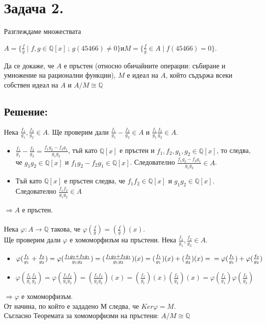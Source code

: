 \documentclass[10pt]{article}
\newcommand*{\Q}{\mathbb{Q}}
\begin{document}
\section*{Задача 2.}
Разглеждаме множествата
\begin{center}
	$A = \{\frac{f}{g} \mid f, g \in \Q[x] \,;\, g(45466) \neq 0\}$\quad и\quad$M = \{\frac{f}{g} \in A \mid f(45466) = 0\}$.
\end{center}
Да се докаже, че $A$ е пръстен (относно обичайните операции: събиране и умножение на рационални
функции), $M$ е идеал на $A$, който съдържа всеки собствен идеал на $A$ и $A/M \cong \Q$
\subsection*{Решение:}
Нека $\frac{f_1}{g_1}, \frac{f_2}{g_2} \in A$.
Ще проверим дали $\frac{f_1}{g_1} - \frac{f_2}{g_2} \in A$ и $\frac{f_1}{g_1}\frac{f_2}{g_2} \in A$.\\
\begin{itemize}
	\item $\frac{f_1}{g_1} - \frac{f_2}{g_2} = \frac{f_1g_2 - f_2g_1}{g_1g_2}$, тъй като $\Q[x]$ е пръстен и $f_1, f_2, g_1, g_2 \in \Q[x]$, то следва, че $g_1g_2 \in \Q[x]$ и $f_1g_2 - f_2g_1 \in \Q[x]$. Следователно $\frac{f_1g_2 - f_2g_1}{g_1g_2} \in A$.
	\item Тъй като $\Q[x]$ е пръстен следва, че $f_1f_2 \in \Q[x]$ и $g_1g_2 \in \Q[x]$. Следователно $\frac{f_1f_2}{g_1g_2} \in A$
\end{itemize}
$\Rightarrow A$ е пръстен.\\
\\
Нека $\varphi: A \to \Q$ такова, че $\varphi(\frac{f}{g}) = (\frac{f}{g})(x)$.\\
Ще проверим дали $\varphi$ е хомоморфизъм на пръстени. Нека $\frac{f_1}{g_1}, \frac{f_2}{g_2} \in A$.
\begin{itemize}
	\item $\varphi(\frac{f_1}{g_1} + \frac{f_2}{g_2}) = \varphi(\frac{f_1g_2 + f_2g_1}{g_1g_2}) = (\frac{f_1g_2 + f_2g_1}{g_1g_2})(x) = (\frac{f_1}{g_1})(x) + (\frac{f_2}{g_2})(x) = \\ = \varphi(\frac{f_1}{g_1}) + \varphi(\frac{f_2}{g_2})$
	\item $\varphi(\frac{f_1}{g_1}\frac{f_2}{g_2}) = \varphi(\frac{f_1f_2}{g_1g_2}) = (\frac{f_1f_2}{g_1g_2})(x) = (\frac{f_1}{g_1})(x)(\frac{f_2}{g_2})(x) = \varphi(\frac{f_1}{g_1})\varphi(\frac{f_2}{g_2})$
\end{itemize}
$\Rightarrow \varphi$ е хомоморфизъм.\\
От начина, по който е зададено $М$ следва, че $Ker\varphi = M$.\\
Съгласно Теоремата за хомоморфизми на пръстени: $A/M \cong \Q$
\end{document}
